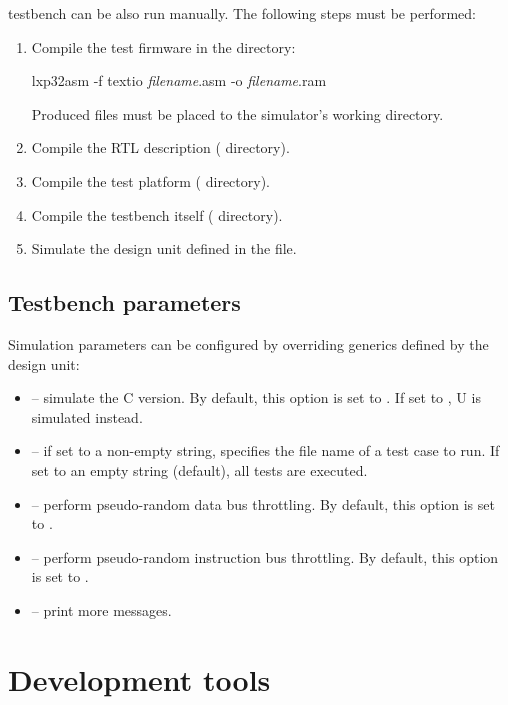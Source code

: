 \documentclass[a4paper,12pt,twoside,extrafontsizes]{memoir}
\begin{document}
\lxp{} testbench can be also run manually. The following steps must be performed:

\begin{enumerate}
	\item Compile the test firmware in the  directory:
	
	\begin{codepar}
    lxp32asm -f textio \emph{filename}.asm -o \emph{filename}.ram
	\end{codepar}
	
	Produced  files must be placed to the simulator's working directory.
	\item Compile the \lxp{} RTL description ( directory).
	\item Compile the test platform ( directory).
	\item Compile the testbench itself ( directory).
	\item Simulate the  design unit defined in the  file.
\end{enumerate}

\section{Testbench parameters}

Simulation parameters can be configured by overriding generics defined by the  design unit:

\begin{itemize}
	\item {} -- simulate the \lxp{}C version. By default, this option is set to . If set to , \lxp{}U is simulated instead.
	\item {} -- if set to a non-empty string, specifies the file name of a test case to run. If set to an empty string (default), all tests are executed.
	\item {} -- perform pseudo-random data bus throttling. By default, this option is set to .
	\item {} -- perform pseudo-random instruction bus throttling. By default, this option is set to .
	\item {} -- print more messages.
\end{itemize}

\chapter{Development tools}
\label{ch:developmenttools}
\end{document}
